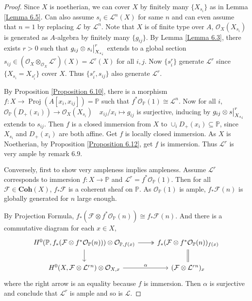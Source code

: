 \documentclass{ctexart}
\newcommand{\proj}{\operatorname{Proj}}
\newcommand{\coherent}{\mathbf{Coh}}
\begin{document}
\begin{proof}
    Since $X$ is noetherian, we can cover $X$ by finitely many $\{X_{s_{i}}\}$ as in Lemma \ref{Lemma 6.5}.
    Can also assume $s_{i}\in \mathcal{L}^{n}(X)$ for same $n$ and can even assume that $n = 1$ by replacing $\mathcal{L}$ by $\mathcal{L}^{n}$.
    Note that $X$ is of finite type over $A$, $\mathcal{O}_{X}(X_{s_{i}})$ is generated as $A$-algebra by finitely many $\{g_{ij}\}$.
    By Lemma \ref{Lemma 6.3}, there exists $r > 0$ such that $g_{ij} \otimes s_{i}\big{|}_{X_{s_{i}}}^{r}$ extends to a global section $s_{ij}\in (\mathcal{O}_{X} \otimes_{\mathcal{O}_{X}} \mathcal{L}^{r})(X) = \mathcal{L}^{r}(X)$ for all $i,j$.
    Now $\{s_{i}^{r}\}$ generate $\mathcal{L}^{r}$ since $\{X_{s_{i}} = X_{s_{i}^{r}}\}$ cover $X$.
    Thus $\{s_{i}^{r}, s_{ij}\}$ also generate $\mathcal{L}^{r}$.
    \par
    By Proposition \ref{Proposition 6.10}, there is a morphism $f: X \longrightarrow \proj(A[x_{i}, x_{ij}]) = \mathbb{P}$ such that $f^{\ast}\mathcal{O}_{\mathbb{P}}(1) \cong \mathcal{L}^{n}$.
    Now for all $i$, $\mathcal{O}_{\mathbb{P}}(D_{+}(x_{i})) \longrightarrow \mathcal{O}_{X}(X_{s_{i}})\quad x_{ij}/x_{i} \longmapsto g_{ij}$ is surjective, inducing by $g_{ij} \otimes s\big{|}_{X_{s_{i}}}^{r}$ extends to $s_{ij}$.
    Then $f$ is a closed immersion from $X$ to $\cup_{i} D_{+}(x_{i}) \subseteq \mathbb{P}$, since $X_{s_{i}}$ and $D_{+}(x_{i})$ are both affine.
    Get $f$ is locally closed immersion.
    As $X$ is Noetherian, by Proposition \ref{Proposition 6.12}, get $f$ is immersion.
    Thus $\mathcal{L}^{r}$ is very ample by remark 6.9.
    \par
    Conversely, first to show very ampleness implies ampleness.
    Assume $\mathcal{L}^{r}$ corresponds to immersion $f: X \rightarrow \mathbb{P}$ and $\mathcal{L}^{r} = f^{\ast}\mathcal{O}_{\mathbb{P}}(1)$.
    Then for all $\mathcal{F}\in \coherent (X)$, $f_{\ast}\mathcal{F}$ is a coherent sheaf on $\mathbb{P}$.
    As $\mathcal{O}_{\mathbb{P}}(1)$ is ample, $f_{\ast}\mathcal{F}(n)$ is globally generated for $n$ large enough.
    \par
    By Projection Formula, $f_{\ast}(\mathcal{F} \otimes f^{\ast}\mathcal{O}_{\mathbb{P}}(n)) \cong f_{\ast}\mathcal{F}(n)$.
    And there is a commutative diagram for each $x\in X$,
    \begin{equation*}
        \begin{tikzcd}
            H^{0}(\mathbb{P}, f_{\ast}(\mathcal{F} \otimes f^{\ast}\mathcal{O}_{\mathbb{P}}(n))) \otimes \mathcal{O}_{\mathbb{P}, f(x)} \arrow[r, twoheadrightarrow] \arrow[d] &
            f_{\ast}(\mathcal{F} \otimes f^{\ast}\mathcal{O}_{\mathbb{P}}(n))_{f(x)} \arrow[d, equal] \\
            H^{0}(X, \mathcal{F} \otimes \mathcal{L}^{rn}) \otimes \mathcal{O}_{X, x} \arrow[r, "\alpha"] &
            (\mathcal{F} \otimes \mathcal{L}^{rn})_{x}
        \end{tikzcd}
    \end{equation*}
    where the right arrow is an equality because $f$ is immersion.
    Then $\alpha$ is surjective and conclude that $\mathcal{L}^{r}$ is ample and so is $\mathcal{L}$.
\end{proof}
\end{document}
